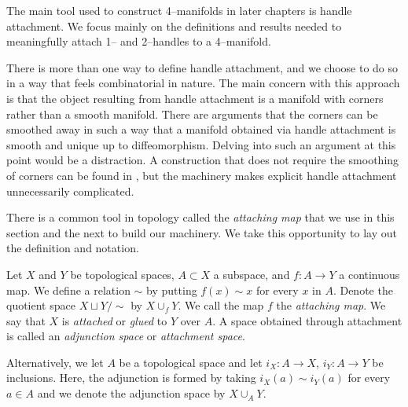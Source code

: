 The main tool used to construct 4--manifolds in later chapters is handle attachment.
We focus mainly on the definitions and results needed to meaningfully attach 1-- and 2--handles to a 4--manifold.

%	
%
%


\begin{rmk}
	\label{rmk:corners}
	There is more than one way to define handle attachment, and we choose to do so in a way that feels combinatorial in nature.
	The main concern with this approach is that the object resulting from handle attachment is a manifold with corners rather than a smooth manifold.
	There are arguments that the corners can be smoothed away in such a way that a manifold obtained via handle attachment is smooth and unique up to diffeomorphism.
	Delving into such an argument at this point would be a distraction.	
	A construction that does not require the smoothing of corners can be found in \cite{Kosi93}, but the machinery makes explicit handle attachment unnecessarily complicated.
\end{rmk}

There is a common tool in topology called the \emph{attaching map} that we use in this section and the next to build our machinery.
We take this opportunity to lay out the definition and notation.

\begin{defn}
  Let $X$ and $Y$ be topological spaces, $A\subset X$ a subspace, and $f:A\to Y$ a continuous map.
  We define a relation $\sim$ by putting $f(x)\sim x$ for every $x$ in $A$.
  Denote the quotient space $X\sqcup Y/\sim$ by $X\cup_f Y$.
  We call the map $f$ the \emph{attaching map}.  
  We say that $X$ is \emph{attached} or \emph{glued} to $Y$ over $A$.
  A space obtained through attachment is called an \emph{adjunction space} or \emph{attachment space}.
  
  Alternatively, we let $A$ be a topological space and let $i_X:A\to X$, $i_Y:A\to Y$ be inclusions.
  Here, the adjunction is formed by taking $i_X(a)\sim i_Y(a)$ for every $a\in A$ and we denote the adjunction space by $X\cup_A Y$.
\end{defn}

